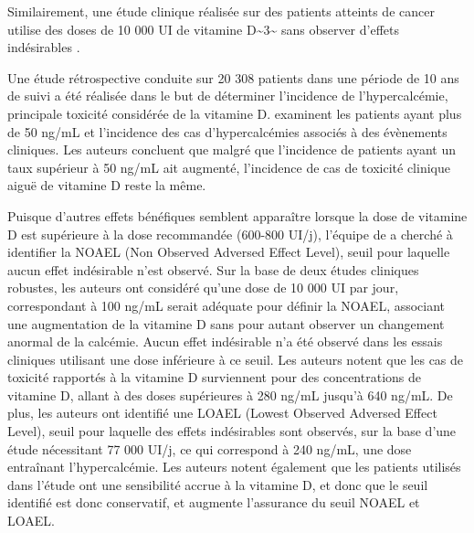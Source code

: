 \documentclass[
  a4paper,
  DIV=11,
  numbers=noendperiod,
  listof=totoc]{scrreprt}
\begin{document}
Similairement, une étude clinique réalisée sur des patients atteints de
cancer utilise des doses de 10 000 UI de vitamine
D\textasciitilde3\textasciitilde{} sans observer d'effets indésirables
\autocite{Amir.2010}.

Une étude rétrospective conduite sur 20 308 patients dans une période de
10 ans de suivi a été réalisée dans le but de déterminer l'incidence de
l'hypercalcémie, principale toxicité considérée de la vitamine D.
\textcite{Dudenkov.2015} examinent les patients ayant plus de 50 ng/mL
et l'incidence des cas d'hypercalcémies associés à des évènements
cliniques. Les auteurs concluent que malgré que l'incidence de patients
ayant un taux supérieur à 50 ng/mL ait augmenté, l'incidence de cas de
toxicité clinique aiguë de vitamine D reste la même.

Puisque d'autres effets bénéfiques semblent apparaître lorsque la dose
de vitamine D est supérieure à la dose recommandée (600-800 UI/j),
l'équipe de \textcite{Hathcock.2007} a cherché à identifier la NOAEL
(Non Observed Adversed Effect Level), seuil pour laquelle aucun effet
indésirable n'est observé. Sur la base de deux études cliniques
robustes, les auteurs ont considéré qu'une dose de 10 000 UI par jour,
correspondant à 100 ng/mL serait adéquate pour définir la NOAEL,
associant une augmentation de la vitamine D sans pour autant observer un
changement anormal de la calcémie. Aucun effet indésirable n'a été
observé dans les essais cliniques utilisant une dose inférieure à ce
seuil. Les auteurs notent que les cas de toxicité rapportés à la
vitamine D surviennent pour des concentrations de vitamine D, allant à
des doses supérieures à 280 ng/mL jusqu'à 640 ng/mL. De plus, les
auteurs ont identifié une LOAEL (Lowest Observed Adversed Effect Level),
seuil pour laquelle des effets indésirables sont observés, sur la base
d'une étude nécessitant 77 000 UI/j, ce qui correspond à 240 ng/mL, une
dose entraînant l'hypercalcémie. Les auteurs notent également que les
patients utilisés dans l'étude ont une sensibilité accrue à la vitamine
D, et donc que le seuil identifié est donc conservatif, et augmente
l'assurance du seuil NOAEL et LOAEL.
\end{document}
